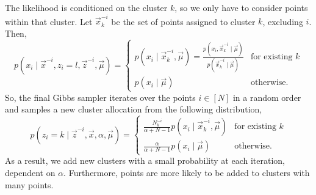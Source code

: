 The likelihood is conditioned on the cluster $k$, so we only have to consider points within that
cluster. Let $\vec{x}^{-i}_{k}$ be the set of points assigned to cluster $k$, excluding $i$. Then, \[
    p(x_i \mid \vec{x}^{-i}, z_i = l, \vec{z}^{-i}, \vec{\mu}) = \begin{cases}
        p(x_i \mid \vec{x}^{-i}_k, \vec{\mu}) = \frac{p(x_i, \vec{x}^{-i}_{k} \mid \vec{\mu})}{p(\vec{x}^{-i}_k \mid \vec{\mu})} & \text{for existing $k$} \\
        p(x_i \mid \vec{\mu})                                                                                                    & \text{otherwise}.
    \end{cases}
\]
So, the final Gibbs sampler iterates over the points $i \in [N]$ in a random order and samples a
new cluster allocation from the following distribution, \[
    p(z_i = k \mid \vec{z}^{-i}, \vec{x}, \alpha, \vec{\mu}) = \begin{cases}
        \frac{N^{-i}_k}{\alpha + N - 1} p(x_i \mid \vec{x}^{-i}_k, \vec{\mu}) & \text{for existing $k$} \\
        \frac{\alpha}{\alpha + N - 1} p(x_i \mid \vec{\mu})                   & \text{otherwise}.
    \end{cases}
\]
As a result, we add new clusters with a small probability at each iteration, dependent on $\alpha$.
Furthermore, points are more likely to be added to clusters with many points.
